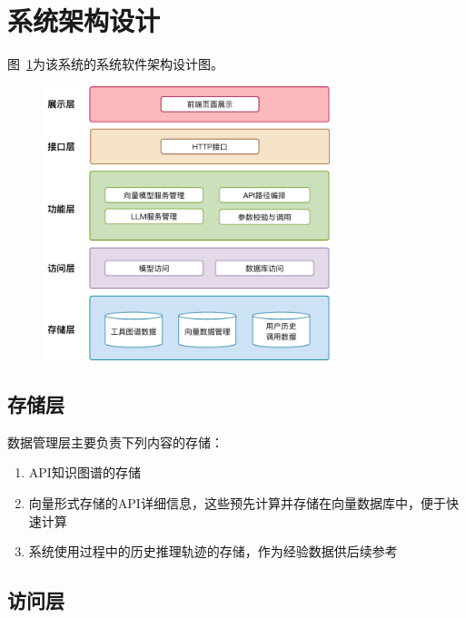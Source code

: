 \section{系统架构设计}

图~\ref{fig:system}为该系统的系统软件架构设计图。

\begin{figure}[!htp]
    \vspace{1em}
    \centering
    \setlength{\abovecaptionskip}{10pt} %
    \includegraphics[height=8cm]{../assets/ch5-系统架构图.pdf}
    \label{fig:system}
  \end{figure}

\subsection{存储层}
数据管理层主要负责下列内容的存储：
\begin{enumerate}
    \item API知识图谱的存储
    \item 向量形式存储的API详细信息，这些预先计算并存储在向量数据库中，便于快速计算
    \item 系统使用过程中的历史推理轨迹的存储，作为经验数据供后续参考
\end{enumerate}

\subsection{访问层}

